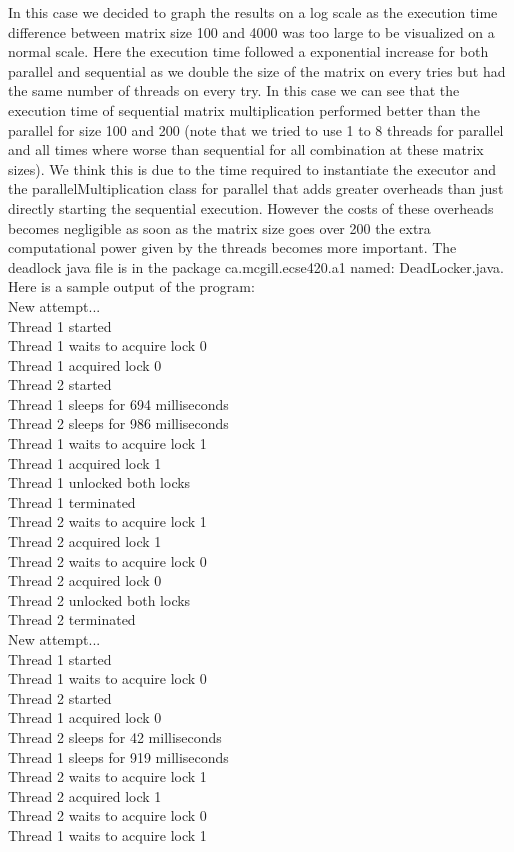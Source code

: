 \documentclass[11pt,letterpaper]{exam}
\begin{document}
\begin{questions}
			In this case we decided to graph the results on a log scale as the execution time difference between matrix size 100 and 4000 was too large to be visualized on a normal scale. Here the execution time followed a exponential increase for both parallel and sequential as we double the size of the matrix on every tries but had the same number of threads on every try. In this case we can see that the execution time of sequential matrix multiplication performed better than the parallel for size 100 and 200 (note that we tried to use 1 to 8 threads for parallel and all times where worse than sequential for all combination at these matrix sizes). We think this is due to the time required to instantiate the executor and the parallelMultiplication class for parallel that adds greater overheads than just directly starting the sequential execution. However the costs of these overheads becomes negligible as soon as the matrix size goes over 200 the extra computational power given by the threads becomes more important.
		\question
			The deadlock java file is in the package ca.mcgill.ecse420.a1 named: DeadLocker.java.
			Here is a sample output of the program:\\
			New attempt...\\
			Thread 1 started\\
			Thread 1 waits to acquire lock 0\\
			Thread 1 acquired lock 0\\
			Thread 2 started\\
			Thread 1 sleeps for 694 milliseconds\\
			Thread 2 sleeps for 986 milliseconds\\
			Thread 1 waits to acquire lock 1\\
			Thread 1 acquired lock 1\\
			Thread 1 unlocked both locks\\
			Thread 1 terminated\\
			Thread 2 waits to acquire lock 1\\
			Thread 2 acquired lock 1\\
			Thread 2 waits to acquire lock 0\\
			Thread 2 acquired lock 0\\
			Thread 2 unlocked both locks\\
			Thread 2 terminated\\
			New attempt...\\
			Thread 1 started\\
			Thread 1 waits to acquire lock 0\\
			Thread 2 started\\
			Thread 1 acquired lock 0\\
			Thread 2 sleeps for 42 milliseconds\\
			Thread 1 sleeps for 919 milliseconds\\
			Thread 2 waits to acquire lock 1\\
			Thread 2 acquired lock 1\\
			Thread 2 waits to acquire lock 0\\
			Thread 1 waits to acquire lock 1\\
			\begin{parts}

\end{parts}
\end{questions}
\end{document}
